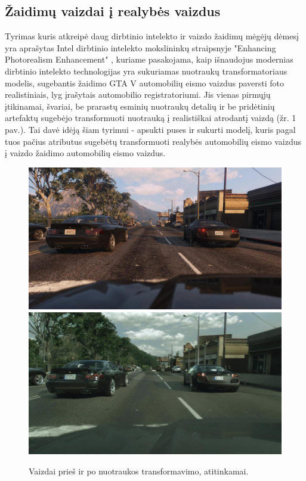 \documentclass{VUMIFPSkursinis}
\begin{document}
    \subsection{Žaidimų vaizdai į realybės vaizdus}
        Tyrimas kuris atkreipė daug dirbtinio intelekto ir vaizdo žaidimų mėgėjų dėmesį yra aprašytas Intel dirbtinio intelekto mokslininkų straipsnyje "Enhancing Photorealism Enhancement" \cite{EnPhEn}, kuriame pasakojama, kaip išnaudojus modernias dirbtinio intelekto technologijas yra sukuriamas nuotraukų transformatoriaus modelis, sugebantis žaidimo GTA V automobilių eismo vaizdus paversti foto realistiniais, lyg įrašytais automobilio registratoriumi. Jis vienas pirmųjų įtikinamai, švariai, be prarastų esminių nuotraukų detalių ir be pridėtinių artefaktų sugebėjo transformuoti nuotrauką į realistiškai atrodantį vaizdą (žr. 1 pav.). Tai davė idėją šiam tyrimui - apsukti puses ir sukurti modelį, kuris pagal tuos pačius atributus sugebėtų transformuoti realybės automobilių eismo vaizdus į vaizdo žaidimo automobilių eismo vaizdus.
        \begin{figure}[H]
            \centering
            \includegraphics[scale=0.25]{img/EnPhEn_before}
            \includegraphics[scale=0.25]{img/EnPhEn_after}
            \caption{Vaizdai prieš ir po nuotraukos transformavimo, atitinkamai.\cite{EnPhEn}}
            \label{img:mlp}
        \end{figure}
\end{document}
